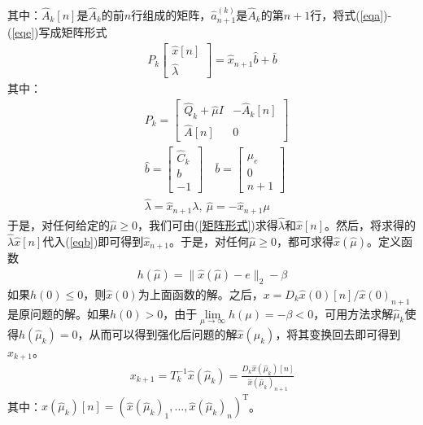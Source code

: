         其中：${\hat{A}}_k[n]$是${\hat{A}}_k$的前$n$行组成的矩阵，${\hat{a}}_{n+1}^{(k)}$是${\hat{A}}_k$的第$n+1$行，将式(\ref{eqa})-(\ref{eqe})写成矩阵形式
        \begin{align}
        \label{矩阵形式}
        P_k\begin{bmatrix}{\hat{x}}[n]\\ \hat{\lambda} \end{bmatrix}={\hat{x}}_{n+1}\hat{b}+\bar{b}
        \end{align}
        其中：
        \begin{align*}
        &P_k = \begin{bmatrix}{\hat{Q}}_k+{\hat{\mu}}I&-{\hat{A}}_k[n]\\{\hat{A}}[n]&0 \end{bmatrix}\\
        &\hat{b} = \begin{bmatrix}{\hat{C}}_k\\b\\-1 \end{bmatrix}\quad \bar{b} = \begin{bmatrix}{\hat{\mu}}_e\\0\\n+1 \end{bmatrix}\\
        &{\hat{\lambda}}={\hat{x}}_{n+1}\lambda,\ \hat{\mu} = -\hat{x}_{n+1}\mu
        \end{align*}
        于是，对任何给定的${\hat{\mu}} \geqslant 0$，我们可由(\ref{矩阵形式})求得${\hat{\lambda}}$和${\hat{x}}[n]$。然后，将求得的${\hat{\lambda}}{\hat{x}}[n]$代入(\ref{eqb})即可得到${\hat{x}}_{n+1}$。于是，对任何${\hat{\mu}} \geqslant 0$，都可求得${\hat{x}}(\hat{\mu})$。定义函数
        \begin{align*}
        h(\hat{\mu})=\|\hat{x}(\hat{\mu})-e\|_2 - \beta
        \end{align*}
        如果$h(0) \leqslant 0$，则$\hat{x}(0)$为上面函数的解。之后，$x=D_k\hat{x}(0)[n]/{\hat{x}(0)}_{n+1}$是原问题的解。如果$h(0)>0$，由于$\mathop {\lim}\limits_{\mu \to \infty}h(\mu)=-\beta<0$，可用方法求解${\hat{\mu}}_k$使得$h({\hat{\mu}}_k)=0$，从而可以得到强化后问题的解${\hat{x}}({\mu}_k)$，将其变换回去即可得到$x_{k+1}$。
        \begin{align*}
        x_{k+1}=T_k^{-1}\hat{x}({\hat{\mu}}_k) = \frac{D_k\hat{x}({\hat{\mu}}_k)[n]}{{\hat{x}({\hat{\mu}}_k)}_{n+1}}
        \end{align*}
        其中：$\hat{x}({\hat{\mu}}_k)[n]=(\hat{x}({\hat{\mu}}_k)_1,\ldots,\hat{x}({\hat{\mu}}_k)_n)^\mathrm{T} $。
